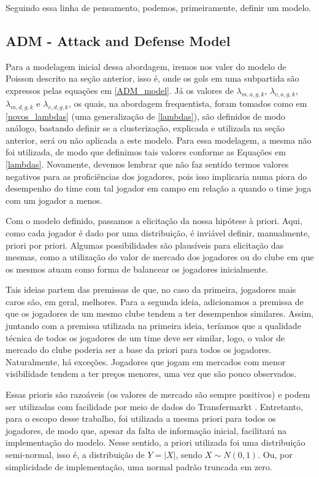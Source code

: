 Seguindo essa linha de pensamento, podemos, primeiramente, definir um modelo.

\subsection{ADM - Attack and Defense Model}
\label{ADM_text}

Para a modelagem inicial dessa abordagem, iremos nos valer do modelo de Poisson descrito na seção anterior, isso é, onde os gols em uma subpartida são expressos pelas equações em \ref{ADM_model}. Já os valores de $\lambda_{m,a,g,k}$, $\lambda_{v,a,g,k}$, $\lambda_{m,d,g,k}$ e $\lambda_{v,d,g,k}$, os quais, na abordagem frequentista, foram tomados como em \ref{novos_lambdas} (uma generalização de \ref{lambdas}), são definidos de modo análogo, bastando definir se a clusterização, explicada e utilizada na seção anterior, será ou não aplicada a este modelo. Para essa modelagem, a mesma não foi utilizada, de modo que definimos tais valores conforme as Equações em \ref{lambdas}. Novamente, devemos lembrar que não faz sentido termos valores negativos para as proficiências dos jogadores, pois isso implicaria numa piora do desempenho do time com tal jogador em campo em relação a quando o time joga com um jogador a menos.

Com o modelo definido, passamos a elicitação da nossa hipótese à priori. Aqui, como cada jogador é dado por uma distribuição, é inviável definir, manualmente, priori por priori. Algumas possibilidades são plausíveis para elicitação das mesmas, como a utilização do valor de mercado dos jogadores ou do clube em que os mesmos atuam como forma de balancear os jogadores inicialmente.

Tais ideias partem das premissas de que, no caso da primeira, jogadores mais caros são, em geral, melhores. Para a segunda ideia, adicionamos a premissa de que os jogadores de um mesmo clube tendem a ter desempenhos similares. Assim, juntando com a premissa utilizada na primeira ideia, teríamos que a qualidade técnica de todos os jogadores de um time deve ser similar, logo, o valor de mercado do clube poderia ser a base da priori para todos os jogadores. Naturalmente, há exceções. Jogadores que jogam em mercados com menor visibilidade tendem a ter preços menores, uma vez que são pouco observados.

Essas prioris são razoáveis (os valores de mercado são sempre positivos) e podem ser utilizadas com facilidade por meio de dados do Transfermarkt \cite{transfermarkt}. Entretanto, para o escopo desse trabalho, foi utilizada a mesma priori para todos os jogadores, de modo que, apesar da falta de informação inicial, facilitará na implementação do modelo. Nesse sentido, a priori utilizada foi uma distribuição semi-normal, isso é, a distribuição de $Y = |X|$, sendo $X\sim N(0, 1)$. Ou, por simplicidade de implementação, uma normal padrão truncada em zero.

